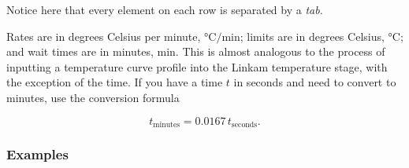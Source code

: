 Notice here that every element on each row is separated by a \textit{tab}.

Rates are in degrees Celsius per minute, $ \si{\degreeCelsius\per\minute} $; limits are in degrees Celsius, $ \si{\degreeCelsius} $; and wait times are in minutes, $ \si{\minute} $. This is almost analogous to the process of inputting a temperature curve profile into the Linkam temperature stage, with the exception of the time. If you have a time $ t $ in seconds and need to convert to minutes, use the conversion formula

\begin{equation}\label{eq:sec_to_min_conv}
	t_\text{minutes} = 0.0167\,t_\text{seconds}.
\end{equation}

\subsubsection{Examples}
